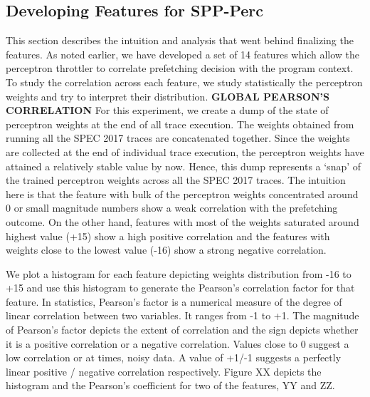 \documentclass{sig-alternate}
\begin{document}
\subsection{Developing Features for SPP-Perc}
This section describes the intuition and analysis that went behind finalizing the features. 
As noted earlier, we have developed a set of 14 features which allow the perceptron throttler to correlate prefetching decision with the program context. 
To study the correlation across each feature, we study statistically the perceptron weights and try to interpret their distribution.
\newline  \newline
\textbf{GLOBAL PEARSON'S CORRELATION}\newline
For this experiment, we create a dump of the state of perceptron weights at the end of all trace execution.
The weights obtained from running all the SPEC 2017 traces are concatenated together. 
Since the weights are collected at the end of individual trace execution, the perceptron weights have attained a relatively stable value by now.
Hence, this dump represents a `snap' of the trained perceptron weights across all the SPEC 2017 traces.
The intuition here is that the feature with bulk of the perceptron weights concentrated around 0 or small magnitude numbers show a weak correlation with the prefetching outcome. 
On the other hand, features with most of the weights saturated around highest value (+15) show a high positive correlation and the features with weights close to the lowest value (-16) show a strong negative correlation.

We plot a histogram for each feature depicting weights distribution from -16 to +15 and use this histogram to generate the Pearson's correlation factor for that feature.
In statistics, Pearson's factor is a numerical measure of the degree of linear correlation between two variables.
It ranges from -1 to +1.
The magnitude of Pearson's factor depicts the extent of correlation and the sign depicts whether it is a positive correlation or a negative correlation.
Values close to 0 suggest a low correlation or at times, noisy data.
A value of +1/-1 suggests a perfectly linear positive / negative correlation respectively.
Figure XX depicts the histogram and the Pearson's coefficient for two of the features, YY and ZZ.
\end{document}
